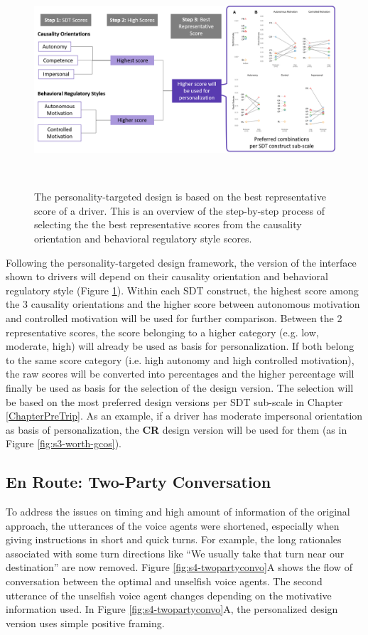 \begin{figure}[h]
\centering
  \includegraphics[scale=.45]{figures/s4-ptd.png}
  \caption{The personality-targeted design is based on the best representative score of a driver. This is an overview of the step-by-step process of selecting the the best representative scores from the causality orientation and behavioral regulatory style scores.}~\label{fig:s4-ptd}
\end{figure}

Following the personality-targeted design framework, the version of the interface shown to drivers will depend on their causality orientation and behavioral regulatory style (Figure \ref{fig:s4-ptd}). Within each SDT construct, the highest score among the 3 causality orientations and the higher score between autonomous motivation and controlled motivation will be used for further comparison. Between the 2 representative scores, the score belonging to a higher category (e.g. low, moderate, high) will already be used as basis for personalization. If both belong to the same score category (i.e. high autonomy and high controlled motivation), the raw scores will be converted into percentages and the higher percentage will finally be used as basis for the selection of the design version. The selection will be based on the most preferred design versions per SDT sub-scale in Chapter \ref{ChapterPreTrip}. As an example, if a driver has moderate impersonal orientation as basis of personalization, the \textbf{CR} design version will be used for them (as in Figure \ref{fig:s3-worth-gcos}).

\subsection{En Route: Two-Party Conversation}
To address the issues on timing and high amount of information of the original approach, the utterances of the voice agents were shortened, especially when giving instructions in short and quick turns. For example, the long rationales associated with some turn directions like ``We usually take that turn near our destination'' are now removed. Figure \ref{fig:s4-twopartyconvo}A shows the flow of conversation between the optimal and unselfish voice agents. The second utterance of the unselfish voice agent changes depending on the motivative information used. In Figure \ref{fig:s4-twopartyconvo}A, the personalized design version uses simple positive framing. 

